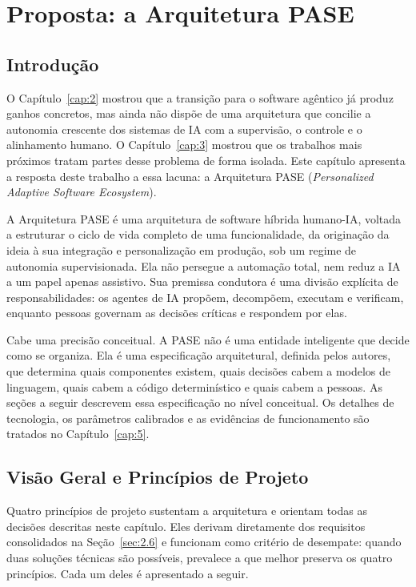 
\chapter{Proposta: a Arquitetura PASE}\label{cap:4}

\section{Introdução}\label{sec:4.1}

O Capítulo~\ref{cap:2} mostrou que a transição para o software agêntico já produz ganhos concretos, mas ainda não dispõe de uma arquitetura que concilie a autonomia crescente dos sistemas de IA com a supervisão, o controle e o alinhamento humano. O Capítulo~\ref{cap:3} mostrou que os trabalhos mais próximos tratam partes desse problema de forma isolada. Este capítulo apresenta a resposta deste trabalho a essa lacuna: a Arquitetura PASE (\textit{Personalized Adaptive Software Ecosystem}).

A Arquitetura PASE é uma arquitetura de software híbrida humano-IA, voltada a estruturar o ciclo de vida completo de uma funcionalidade, da originação da ideia à sua integração e personalização em produção, sob um regime de autonomia supervisionada. Ela não persegue a automação total, nem reduz a IA a um papel apenas assistivo. Sua premissa condutora é uma divisão explícita de responsabilidades: os agentes de IA propõem, decompõem, executam e verificam, enquanto pessoas governam as decisões críticas e respondem por elas.

Cabe uma precisão conceitual. A PASE não é uma entidade inteligente que decide como se organiza. Ela é uma especificação arquitetural, definida pelos autores, que determina quais componentes existem, quais decisões cabem a modelos de linguagem, quais cabem a código determinístico e quais cabem a pessoas. As seções a seguir descrevem essa especificação no nível conceitual. Os detalhes de tecnologia, os parâmetros calibrados e as evidências de funcionamento são tratados no Capítulo~\ref{cap:5}.

\section{Visão Geral e Princípios de Projeto}\label{sec:4.2}

Quatro princípios de projeto sustentam a arquitetura e orientam todas as decisões descritas neste capítulo. Eles derivam diretamente dos requisitos consolidados na Seção~\ref{sec:2.6} e funcionam como critério de desempate: quando duas soluções técnicas são possíveis, prevalece a que melhor preserva os quatro princípios. Cada um deles é apresentado a seguir.

